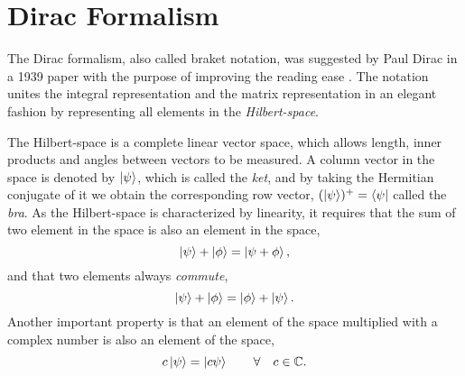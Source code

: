 \chapter{Dirac Formalism} \label{app:dirac}
The Dirac formalism, also called braket notation, was suggested by Paul Dirac in a 1939 paper with the purpose of improving the reading ease \cite{dirac_new_1939}. The notation unites the integral representation and the matrix representation in an elegant fashion by representing all elements in the \textit{Hilbert-space}. 

The Hilbert-space is a complete linear vector space, which allows length, inner products and angles between vectors to be measured. A column vector in the space is denoted by $\ket{\psi}$, which is called the \textit{ket}, and by taking the Hermitian conjugate of it we obtain the corresponding row vector, $(\ket{\psi})^+=\bra{\psi}$ called the \textit{bra}. As the Hilbert-space is characterized by linearity, it requires that the sum of two element in the space is also an element in the space,
\begin{equation}
\ket{\psi}+\ket{\phi}=\ket{\psi+\phi},
\end{equation}
and that two elements always \textit{commute},
\begin{equation}
\ket{\psi}+\ket{\phi}=\ket{\phi}+\ket{\psi}.
\end{equation}
Another important property is that an element of the space multiplied with a complex number is also an element of the space,
\begin{equation}
c\ket{\psi}=\ket{c\psi}\quad\quad\forall\quad c\in\mathbb{C}.
\end{equation}


